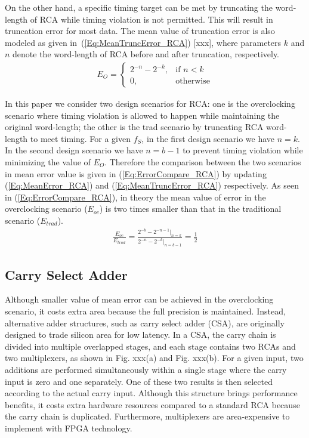 \documentclass[10pt, conference, compsocconf]{IEEEtran}
\begin{document}
On the other hand, a specific timing target can be met by truncating the word-length of RCA while timing violation is not permitted. This will result in truncation error for most data.  The mean value of truncation error is also modeled as given in~(\ref{Eq:MeanTruncError_RCA}) [xxx], where parameters $k$ and $n$ denote the word-length of RCA before and after truncation, respectively. 
%
\begin{eqnarray}\label{Eq:MeanTruncError_RCA}
    E_O=\left\{
        \begin{matrix}
            2^{-n}-2^{-k}, & \textrm{if $n<k$}\\
            0, & \textrm{otherwise}
        \end{matrix}
        \right.
\end{eqnarray}

In this paper we consider two design scenarios for RCA: one is the overclocking scenario where timing violation is allowed to happen while maintaining the original word-length; the other is the trad scenario by truncating RCA word-length to meet timing. For a given $f_S$, in the first design scenario we have $n=k$. In the second design scenario we have $n=b-1$ to prevent timing violation while minimizing the value of $E_O$. Therefore the comparison between the two scenarios in mean error value is given in (\ref{Eq:ErrorCompare_RCA}) by updating (\ref{Eq:MeanError_RCA}) and (\ref{Eq:MeanTruncError_RCA}) respectively. As seen in (\ref{Eq:ErrorCompare_RCA}), in theory the mean value of error in the overclocking scenario ($E_{oc}$) is two times smaller than that in the traditional scenario ($E_{trad}$).
%
\begin{eqnarray}\label{Eq:ErrorCompare_RCA}
    \frac{E_{oc}}{E_{trad}} = \frac{2^{-b}-2^{-n-1}|_{n=k}}{2^{-n}-2^{-k}|_{n=b-1}}=\frac{1}{2}
\end{eqnarray}

\subsection{Carry Select Adder}
Although smaller value of mean error can be achieved in the overclocking scenario, it costs extra area because the full precision is maintained. Instead, alternative adder structures, such as carry select adder (CSA), are originally designed to trade silicon area for low latency. In a CSA, the carry chain is divided into multiple overlapped stages, and each stage contains two RCAs and two multiplexers, as shown in Fig. xxx(a) and Fig. xxx(b). For a given input, two additions are performed simultaneously within a single stage where the carry input is zero and one separately. One of these two results is then selected according to the actual carry input. Although this structure brings performance benefits, it costs extra hardware resources compared to a standard RCA because the carry chain is duplicated. Furthermore, multiplexers are area-expensive to implement with FPGA technology.
\end{document}
